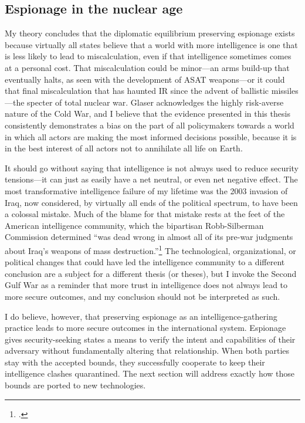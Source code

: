 \documentclass{memoir}
\begin{document}
\subsection{Espionage in the nuclear age}
My theory concludes that the diplomatic equilibrium preserving espionage exists because virtually all states believe that a world with more intelligence is one that is less likely to lead to miscalculation, even if that intelligence sometimes comes at a personal cost. That miscalculation could be minor---an arms build-up that eventually halts, as seen with the development of ASAT weapons---or it could that final miscalculation that has haunted IR since the advent of ballistic missiles---the specter of total nuclear war. Glaser acknowledges the highly risk-averse nature of the Cold War, and I believe that the evidence presented in this thesis consistently demonstrates a bias on the part of all policymakers towards a world in which all actors are making the most informed decisions possible, because it is in the best interest of all actors not to annihilate all life on Earth.

It should go without saying that intelligence is not always used to reduce security tensions---it can just as easily have a net neutral, or even net negative effect. The most transformative intelligence failure of my lifetime was the 2003 invasion of Iraq, now considered, by virtually all ends of the political spectrum, to have been a colossal mistake. Much of the blame for that mistake rests at the feet of the American intelligence community, which the bipartisan Robb-Silberman Commission determined ``was dead wrong in almost all of its pre-war judgments about Iraq's weapons of mass destruction.''\footcite{commission_on_the_intelligence_capabilities_of_the_united_states_regarding_wmds_final_2005} The technological, organizational, or political changes that could have led the intelligence community to a different conclusion are a subject for a different thesis (or theses), but I invoke the Second Gulf War as a reminder that more trust in intelligence does not always lead to more secure outcomes, and my conclusion should not be interpreted as such.

I do believe, however, that preserving espionage as an intelligence-gathering practice leads to more secure outcomes in the international system. Espionage gives security-seeking states a means to verify the intent and capabilities of their adversary without fundamentally altering that relationship. When both parties stay with the accepted bounds, they successfully cooperate to keep their intelligence clashes quarantined. The next section will address exactly how those bounds are ported to new technologies.
\end{document}
